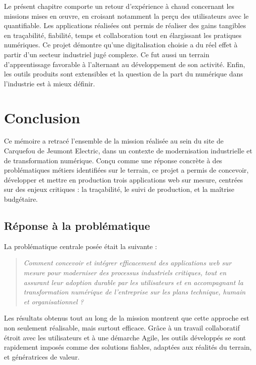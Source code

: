 \documentclass[11pt,a4paper]{article}
\begin{document}
Le présent chapitre comporte un retour d’expérience à chaud concernant les missions mises en œuvre, en croisant notamment la perçu des utilisateurs avec le quantifiable. Les applications réalisées ont permis de réaliser des gains tangibles en traçabilité, fiabilité, temps et collaboration tout en élargissant les pratiques numériques. Ce projet démontre qu’une digitalisation choisie a du réel effet à partir d’un secteur industriel jugé complexe. Ce fut aussi un terrain d’apprentissage favorable à l’alternant au développement de son activité. Enfin, les outils produits sont extensibles et la question de la part du numérique dans l’industrie est à mieux définir.



\newpage
\section*{Conclusion}

Ce mémoire a retracé l’ensemble de la mission réalisée au sein du site de Carquefou de Jeumont Electric, dans un contexte de modernisation industrielle et de transformation numérique. Conçu comme une réponse concrète à des problématiques métiers identifiées sur le terrain, ce projet a permis de concevoir, développer et mettre en production trois applications web sur mesure, centrées sur des enjeux critiques : la traçabilité, le suivi de production, et la maîtrise budgétaire.

\subsection*{Réponse à la problématique}

La problématique centrale posée était la suivante :

\begin{quote}
\emph{Comment concevoir et intégrer efficacement des applications web sur mesure pour moderniser des processus industriels critiques, tout en assurant leur adoption durable par les utilisateurs et en accompagnant la transformation numérique de l’entreprise sur les plans technique, humain et organisationnel ?
}
\end{quote}


Les résultats obtenus tout au long de la mission montrent que cette approche est non seulement réalisable, mais surtout efficace. Grâce à un travail collaboratif étroit avec les utilisateurs et à une démarche Agile, les outils développés se sont rapidement imposés comme des solutions fiables, adaptées aux réalités du terrain, et génératrices de valeur.
\end{document}
